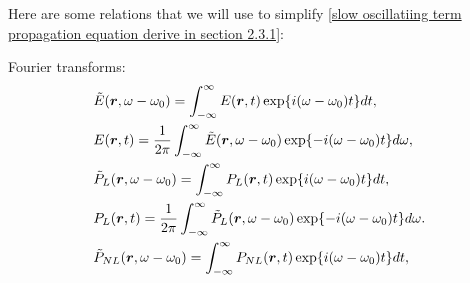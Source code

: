\documentclass[12pt]{extarticle}
\numberwithin{equation}{section}
\numberwithin{figure}{section}
\numberwithin{table}{section}
\newcommand{\<}{\langle}
\renewcommand{\>}{\rangle}
\theoremstyle{definition}
\newcommand{\SubItem}[1]{
    {\setlength\itemindent{15pt} \item[-] #1}
}
\newcommand{\Lap}{\boldsymbol{\bigtriangledown}}
\begin{document}
\begin{itemize}
           
                Here are some relations that we will use to simplify \autoref{slow oscillatiing term propagation equation derive in section 2.3.1}:
                    \SubItem{
                    Fourier transforms:
                    \begin{subequations}
                    \begin{align}
                        &\Tilde{E}(\boldsymbol{r},\omega-\omega_0)=\int_{-\infty}^{\infty}E(\boldsymbol{r},t)\exp{i(\omega-\omega_0)t}dt, \label{fourier transform of slow oscillating term of E}\\
                        &E(\boldsymbol{r},t)=\frac{1}{2\pi}\int_{-\infty}^{\infty}\Tilde{E}(\boldsymbol{r},\omega-\omega_0)\exp{-i(\omega-\omega_0)t}d\omega, \label{inverse fourier transform of slow oscillating term of E}\\
                        &\Tilde{P}_L(\boldsymbol{r},\omega-\omega_0)=\int_{-\infty}^{\infty}P_L(\boldsymbol{r},t)\exp{i(\omega-\omega_0)t}dt, \label{fourier transform of slow oscillating term of PL}\\
                        &P_L(\boldsymbol{r},t)=\frac{1}{2\pi}\int_{-\infty}^{\infty}\Tilde{P}_L(\boldsymbol{r},\omega-\omega_0)\exp{-i(\omega-\omega_0)t}d\omega. \label{inverse fourier transform of slow oscillating term of PL}\\
                        &\Tilde{P}_{NL}(\boldsymbol{r},\omega-\omega_0)=\int_{-\infty}^{\infty}P_{NL}(\boldsymbol{r},t)\exp{i(\omega-\omega_0)t}dt, \label{fourier transform of slow oscillating term of PNL}\\

\end{align}
\end{subequations}}
\end{itemize}
\end{document}
